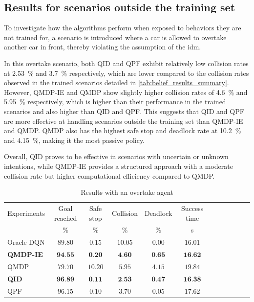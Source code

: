 \subsection{Results for scenarios outside the training set}


To investigate how the algorithms perform when exposed to behaviors they are not trained for, a scenario is introduced where a car is allowed to overtake another car in front, thereby violating the assumption of the \gls{idm}.

In this overtake scenario, both QID and QPF exhibit relatively low collision rates at \SI{2.53}{\percent} and \SI{3.7}{\percent} respectively, which are lower compared to the collision rates observed in the trained scenarios detailed in \ref{tab:belief_results_summary}. 
However, QMDP-IE and QMDP show slightly higher collision rates of \SI{4.6}{\percent} and \SI{5.95}{\percent} respectively, which is higher than their performance in the trained scenarios and also higher than QID and QPF. This suggests that QID and QPF are more effective at handling scenarios outside the training set than QMDP-IE and QMDP.
QMDP also has the highest safe stop and deadlock rate at \SI{10.2}{\percent} and \SI{4.15}{\percent}, making it the most passive policy. 

Overall, QID proves to be effective in scenarios with uncertain or unknown intentions, while QMDP-IE provides a structured approach with a moderate collision rate but higher computational efficiency compared to QMDP.

\begin{table}
	\caption{Results with an overtake agent}
	\label{tab:theis_results_overtake}
	\begin{tabularx}{\columnwidth}{@{}l*{10}{c}c@{}}
	\toprule
	Experiments & Goal reached & Safe stop & Collision & Deadlock & Success time \\ 
			 & $\%$ & $\%$ & $\%$ & $\%$ & s \\ 
	\midrule
	Oracle DQN & $89.80$ & $0.15$ & $10.05$ & $0.00$ & $16.01$ \\ 
	\textbf{QMDP-IE} & $\textbf{94.55}$ & $\textbf{0.20}$ & $\textbf{4.60}$ & $\textbf{0.65}$ & $\textbf{16.62}$ \\ 
	QMDP & $79.70$ & $10.20$ & $5.95$ & $4.15$ & $19.84$ \\ 
	\textbf{QID} & $\textbf{96.89}$ & $\textbf{0.11}$ & $\textbf{2.53}$ & $\textbf{0.47}$ & $\textbf{16.38}$ \\ 
	QPF & $96.15$ & $0.10$ & $3.70$ & $0.05$ & $17.62$ \\ 
	\bottomrule
	\end{tabularx}
	\end{table}
% 			



